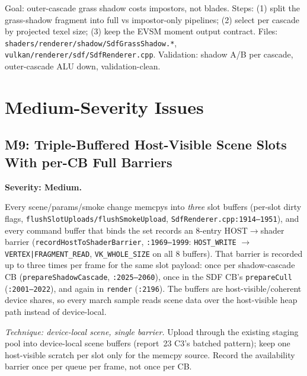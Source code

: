 \documentclass[11pt,a4paper]{article}
\begin{document}
\begin{tcolorbox}[promptbox={Prompt --- H8: shadow-only grass evaluator}]
Goal: outer-cascade grass shadow costs impostors, not blades. Steps:
(1) split the grass-shadow fragment into full vs impostor-only pipelines;
(2) select per cascade by projected texel size; (3) keep the EVSM moment
output contract. Files:
\texttt{shaders/renderer/shadow/SdfGrassShadow.*},
\texttt{vulkan/renderer/sdf/SdfRenderer.cpp}. Validation: shadow A/B per
cascade, outer-cascade ALU down, validation-clean.
\end{tcolorbox}

\section{Medium-Severity Issues}

\subsection{M9: Triple-Buffered Host-Visible Scene Slots With per-CB Full Barriers}
\label{sec:m9}

\textbf{Severity: Medium.}

Every scene/params/smoke change memcpys into \emph{three} slot buffers
(per-slot dirty flags, \texttt{flushSlotUploads/flushSmokeUpload},
\texttt{SdfRenderer.cpp:1914--1951}), and every command buffer that binds the
set records an 8-entry HOST$\rightarrow$shader barrier
(\texttt{recordHostToShaderBarrier}, \texttt{:1969--1999}:
\texttt{HOST\_WRITE} $\rightarrow$ \texttt{VERTEX|FRAGMENT\_READ},
\texttt{VK\_WHOLE\_SIZE} on all 8 buffers). That barrier is recorded up to
three times per frame for the same slot payload: once per shadow-cascade CB
(\texttt{prepareShadowCascade}, \texttt{:2025--2060}), once in the SDF CB's
\texttt{prepareCull} (\texttt{:2001--2022}), and again in \texttt{render}
(\texttt{:2196}). The buffers are host-visible/coherent device shares, so
every march sample reads scene data over the host-visible heap path instead
of device-local.

\textit{Technique: device-local scene, single barrier.} Upload through the
existing staging pool into device-local scene buffers (report~23 C3's batched
pattern); keep one host-visible scratch per slot only for the memcpy source.
Record the availability barrier once per queue per frame, not once per CB.
\end{document}
